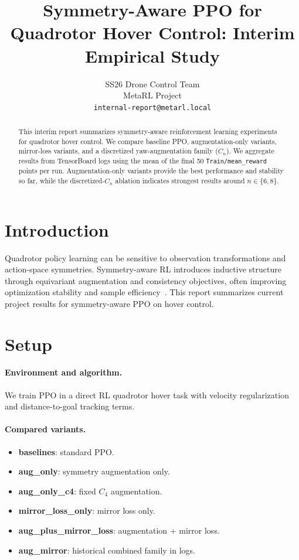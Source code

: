 \documentclass{article}
\title{Symmetry-Aware PPO for Quadrotor Hover Control: Interim Empirical Study}
\author{
  SS26 Drone Control Team \\
  MetaRL Project \\
  \texttt{internal-report@metarl.local}
}
\begin{document}
\maketitle

\begin{abstract}
This interim report summarizes symmetry-aware reinforcement learning experiments for quadrotor hover control. We compare baseline PPO, augmentation-only variants, mirror-loss variants, and a discretized yaw-augmentation family ($C_n$). We aggregate results from TensorBoard logs using the mean of the final 50 \texttt{Train/mean\_reward} points per run. Augmentation-only variants provide the best performance and stability so far, while the discretized-$C_n$ ablation indicates strongest results around $n\in\{6,8\}$.
\end{abstract}

\section{Introduction}
Quadrotor policy learning can be sensitive to observation transformations and action-space symmetries. Symmetry-aware RL introduces inductive structure through equivariant augmentation and consistency objectives, often improving optimization stability and sample efficiency~\citep{mukhopadhyay2020survey,sanchez2023symmetric}. This report summarizes current project results for symmetry-aware PPO on hover control.

\section{Setup}
\paragraph{Environment and algorithm.}
We train PPO in a direct RL quadrotor hover task with velocity regularization and distance-to-goal tracking terms.

\paragraph{Compared variants.}
\begin{itemize}
    \item \textbf{baselines}: standard PPO.
    \item \textbf{aug\_only}: symmetry augmentation only.
    \item \textbf{aug\_only\_c4}: fixed $C_4$ augmentation.
    \item \textbf{mirror\_loss\_only}: mirror loss only.
    \item \textbf{aug\_plus\_mirror\_loss}: augmentation + mirror loss.
    \item \textbf{aug\_mirror}: historical combined family in logs.
\end{itemize}
\end{document}
